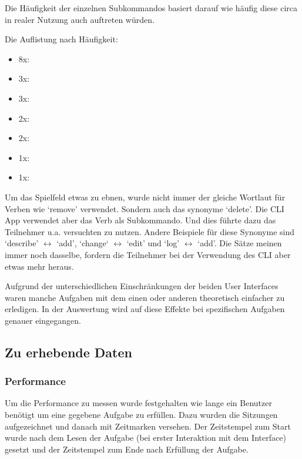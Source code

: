\documentclass[oneside,bibliography=totocnumbered,BCOR=5mm]{scrbook}
\begin{document}
Die Häufigkeit der einzelnen Subkommandos basiert darauf wie häufig diese circa
in realer Nutzung auch auftreten würden.

Die Auflistung nach Häufigkeit:
\label{text:anzahl-aufgaben}
\begin{itemize}
  \item 8x: 
  \item 3x: 
  \item 3x: 
  \item 2x: 
  \item 2x: 
  \item 1x: 
  \item 1x: 
\end{itemize}

Um das Spielfeld etwas zu ebnen, wurde nicht immer der gleiche Wortlaut für
Verben wie `remove' verwendet. Sondern auch das synonyme `delete'. Die CLI App
verwendet aber das Verb  als Subkommando. Und dies führte
dazu das Teilnehmer u.a. versuchten  zu nutzen. Andere
Beispiele für diese Synonyme sind `describe' $\leftrightarrow$ `add', `change`
$\leftrightarrow$ `edit' und `log' $\leftrightarrow$ `add'. Die Sätze meinen
immer noch dasselbe, fordern die Teilnehmer bei der Verwendung des CLI aber
etwas mehr heraus.

Aufgrund der unterschiedlichen Einschränkungen der beiden User Interfaces waren
manche Aufgaben mit dem einen oder anderen theoretisch einfacher zu erledigen.
In der Auswertung wird auf diese Effekte bei spezifischen Aufgaben genauer
eingegangen.

\subsection{Zu erhebende Daten}

\subsubsection{Performance}

Um die Performance zu messen wurde festgehalten wie lange ein Benutzer benötigt
um eine gegebene Aufgabe zu erfüllen. Dazu wurden die Sitzungen aufgezeichnet
und danach mit Zeitmarken versehen. Der Zeitstempel zum Start wurde nach dem
Lesen der Aufgabe (bei erster Interaktion mit dem Interface) gesetzt und der
Zeitstempel zum Ende nach Erfüllung der Aufgabe.
\end{document}
